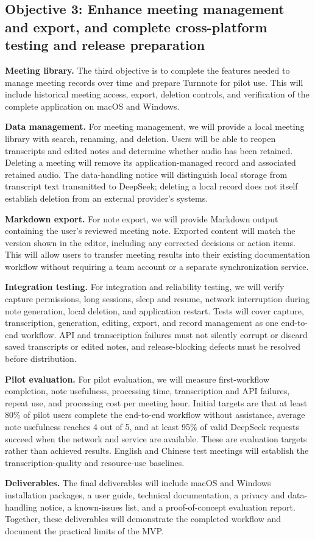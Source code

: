 \documentclass[12pt,a4paper]{article}
\begin{document}
\subsection*{Objective 3: Enhance meeting management and export, and complete cross-platform testing and release preparation}
\textbf{Meeting library.} The third objective is to complete the features needed to manage meeting records over time and prepare Turnnote for pilot use. This will include historical meeting access, export, deletion controls, and verification of the complete application on macOS and Windows.\par
\textbf{Data management.} For meeting management, we will provide a local meeting library with search, renaming, and deletion. Users will be able to reopen transcripts and edited notes and determine whether audio has been retained. Deleting a meeting will remove its application-managed record and associated retained audio. The data-handling notice will distinguish local storage from transcript text transmitted to DeepSeek; deleting a local record does not itself establish deletion from an external provider's systems.\par
\textbf{Markdown export.} For note export, we will provide Markdown output containing the user's reviewed meeting note. Exported content will match the version shown in the editor, including any corrected decisions or action items. This will allow users to transfer meeting results into their existing documentation workflow without requiring a team account or a separate synchronization service.\par
\textbf{Integration testing.} For integration and reliability testing, we will verify capture permissions, long sessions, sleep and resume, network interruption during note generation, local deletion, and application restart. Tests will cover capture, transcription, generation, editing, export, and record management as one end-to-end workflow. API and transcription failures must not silently corrupt or discard saved transcripts or edited notes, and release-blocking defects must be resolved before distribution.\par
\textbf{Pilot evaluation.} For pilot evaluation, we will measure first-workflow completion, note usefulness, processing time, transcription and API failures, repeat use, and processing cost per meeting hour. Initial targets are that at least 80\% of pilot users complete the end-to-end workflow without assistance, average note usefulness reaches 4 out of 5, and at least 95\% of valid DeepSeek requests succeed when the network and service are available. These are evaluation targets rather than achieved results. English and Chinese test meetings will establish the transcription-quality and resource-use baselines.\par
\textbf{Deliverables.} The final deliverables will include macOS and Windows installation packages, a user guide, technical documentation, a privacy and data-handling notice, a known-issues list, and a proof-of-concept evaluation report. Together, these deliverables will demonstrate the completed workflow and document the practical limits of the MVP.\par
{}
\end{document}
